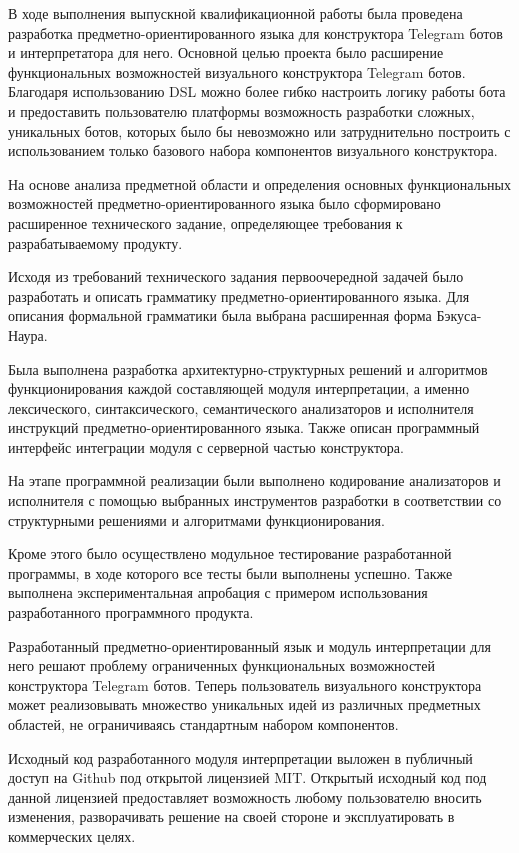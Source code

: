 \newpage


В ходе выполнения выпускной квалификационной работы была проведена разработка предметно-ориентированного языка для конструктора Telegram ботов и интерпретатора для него.
Основной целью проекта было расширение функциональных возможностей визуального конструктора Telegram ботов.
Благодаря использованию DSL можно более гибко настроить логику работы бота и предоставить пользователю платформы возможность разработки сложных, уникальных ботов,
которых было бы невозможно или затруднительно построить с использованием только базового набора компонентов визуального конструктора.

На основе анализа предметной области и определения основных функциональных возможностей предметно-ориентированного языка было сформировано расширенное технического задание,
определяющее требования к разрабатываемому продукту.

Исходя из требований технического задания первоочередной задачей было разработать и описать грамматику предметно-ориентированного языка.
Для описания формальной грамматики была выбрана расширенная форма Бэкуса-Наура.

Была выполнена разработка архитектурно-структурных решений и алгоритмов функционирования каждой составляющей модуля интерпретации,
а именно лексического, синтаксического, семантического анализаторов и исполнителя инструкций предметно-ориентированного языка.
Также описан программный интерфейс интеграции модуля с серверной частью конструктора.

На этапе программной реализации были выполнено кодирование анализаторов и исполнителя с помощью выбранных инструментов разработки
в соответствии со структурными решениями и алгоритмами функционирования.

Кроме этого было осуществлено модульное тестирование разработанной программы, в ходе которого все тесты были выполнены успешно.
Также выполнена экспериментальная апробация с примером использования разработанного программного продукта.

Разработанный предметно-ориентированный язык и модуль интерпретации для него решают проблему ограниченных функциональных возможностей конструктора Telegram ботов.
Теперь пользователь визуального конструктора может реализовывать множество уникальных идей из различных предметных областей,
не ограничиваясь стандартным набором компонентов.

Исходный код разработанного модуля интерпретации выложен в публичный доступ на Github под открытой лицензией MIT.
Открытый исходный код под данной лицензией предоставляет возможность любому пользователю вносить изменения, разворачивать решение на своей стороне и эксплуатировать в коммерческих целях.
